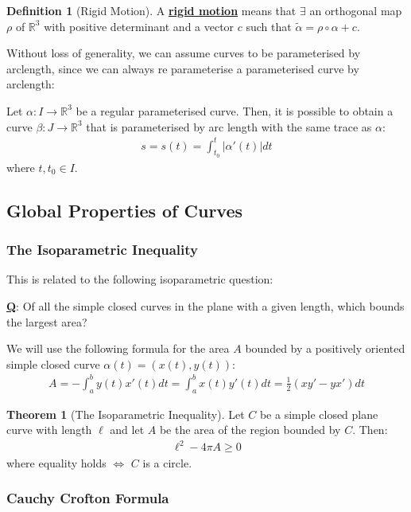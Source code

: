 \documentclass[11pt]{scrartcl}
\newcommand{\R}[0]{\mathbb{R}}
\theoremstyle{definition}
\newtheorem{theorem}{Theorem}
\newtheorem{definition}{Definition}
\theoremstyle{remark}
\newcommand{\dfn}[1]{\textbf{\underline{#1}}}
\newcommand{\idx}[2]{\int_{#1}^{#2}}
\begin{document}
\begin{definition}[Rigid Motion]
	A \dfn{rigid motion} means that $\exists$ an orthogonal map $\rho$ of $\R^3$ with positive determinant and a vector $c$ such that $\widetilde{\alpha} = \rho \circ \alpha + c$. 
\end{definition}

Without loss of generality, we can assume curves to be parameterised by arclength, since we can always re parameterise a parameterised curve by arclength: 

Let $\alpha: I \rightarrow \R^3$ be a regular parameterised curve. Then, it is possible to obtain a curve $\beta: J \rightarrow \R^3$ that is parameterised by arc length with the same trace as $\alpha$: 
\begin{align*}
	s = s(t) = \idx{t_0}{t} | \alpha'(t) | dt
\end{align*}
where $t, t_0 \in I$. 

\subsection{Global Properties of Curves}

\subsubsection{The Isoparametric Inequality}
This is related to the following isoparametric question: 
\begin{center}
	\textbf{\underline{Q}}: Of all the simple closed curves in the plane with a given length, which bounds the largest area? 
\end{center}
We will use the following formula for the area $A$ bounded by a positively oriented simple closed curve $\alpha(t) = (x(t), y(t))$:
\begin{align*}
	A = - \idx{a}{b} y(t) x'(t) dt = \idx{a}{b} x(t)y'(t) dt = \frac{1}{2} (xy' - yx') dt 
\end{align*}

\begin{theorem}[The Isoparametric Inequality]
	Let $C$ be a simple closed plane curve with length $\ell$ and let $A$ be the area of the region bounded by $C$. Then: 
	\begin{align}
		\ell^2 - 4 \pi A \geq 0 	
	\end{align}
	where equality holds $\iff$ $C$ is a circle. 

\end{theorem}

\subsubsection{Cauchy Crofton Formula}
\end{document}
